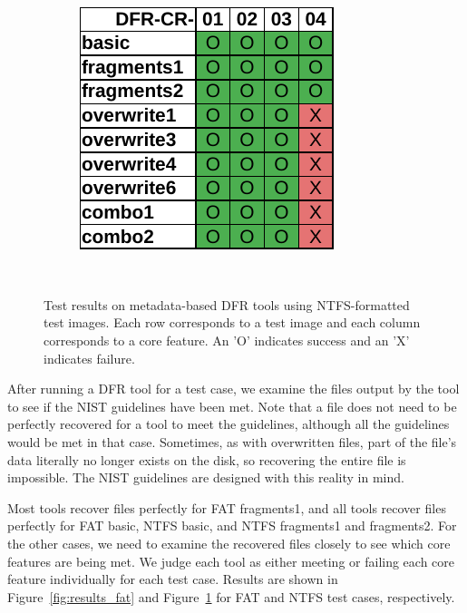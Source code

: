 \begin{figure}
\begin{subfigure}{0.3\linewidth}
    \end{subfigure}~~
    \begin{subfigure}{0.3\linewidth}
        \includegraphics[width=\linewidth]{fig/axiom_results_ntfs.pdf}
    \end{subfigure}~~
        
    \caption{Test results on metadata-based DFR tools using NTFS-formatted test images. Each row corresponds to a test image and each column corresponds to a core feature. An 'O' indicates success and an 'X' indicates failure.}
    \label{fig:results_ntfs}
\end{figure}


After running a DFR tool for a test case, we examine the files output by the tool to see if the NIST guidelines have been met.
Note that a file does not need to be perfectly recovered for a tool to meet the guidelines, although all the guidelines would be met in that case.
Sometimes, as with overwritten files, part of the file's data literally no longer exists on the disk, so recovering the entire file is impossible.
The NIST guidelines are designed with this reality in mind.

Most tools recover files perfectly for FAT fragments1, and all tools recover files perfectly for FAT basic, NTFS basic, and NTFS fragments1 and fragments2.
For the other cases, we need to examine the recovered files closely to see which core features are being met.
We judge each tool as either meeting or failing each core feature individually for each test case.
Results are shown in Figure~\ref{fig:results_fat} and Figure~\ref{fig:results_ntfs} for FAT and NTFS test cases, respectively.

